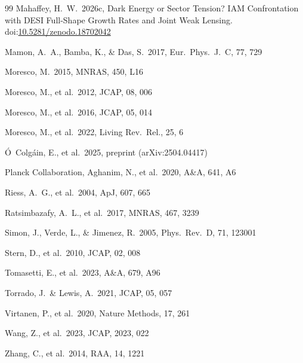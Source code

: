 \documentclass[12pt,a4paper]{article}
\begin{document}
\begin{thebibliography}{99}
Mahaffey, H.\ W.\ 2026c, Dark Energy or Sector Tension? IAM Confrontation with
DESI Full-Shape Growth Rates and Joint Weak Lensing.
doi:\href{https://doi.org/10.5281/zenodo.18702042}{10.5281/zenodo.18702042}

Mamon, A.\ A., Bamba, K., \& Das, S.\ 2017, Eur.\ Phys.\ J.\ C, 77, 729

Moresco, M.\ 2015, MNRAS, 450, L16

Moresco, M., et al.\ 2012, JCAP, 08, 006

Moresco, M., et al.\ 2016, JCAP, 05, 014

Moresco, M., et al.\ 2022, Living Rev.\ Rel., 25, 6

Ó~Colgáin, E., et al.\ 2025, preprint (arXiv:2504.04417)

Planck Collaboration, Aghanim, N., et al.\ 2020, A\&A, 641, A6

Riess, A.\ G., et al.\ 2004, ApJ, 607, 665

Ratsimbazafy, A.\ L., et al.\ 2017, MNRAS, 467, 3239

Simon, J., Verde, L., \& Jimenez, R.\ 2005, Phys.\ Rev.\ D, 71, 123001

Stern, D., et al.\ 2010, JCAP, 02, 008

Tomasetti, E., et al.\ 2023, A\&A, 679, A96

Torrado, J.\ \& Lewis, A.\ 2021, JCAP, 05, 057

Virtanen, P., et al.\ 2020, Nature Methods, 17, 261

Wang, Z., et al.\ 2023, JCAP, 2023, 022

Zhang, C., et al.\ 2014, RAA, 14, 1221

\end{thebibliography}
\end{document}
